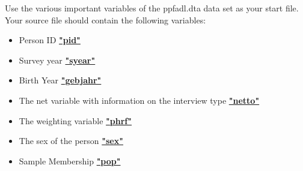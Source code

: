 \documentclass[letterpaper,10pt,openany,onesideH,english]{sphinxmanual}
\begin{document}
Use the various important variables of the ppfadl.dta data set as your start file. Your source file should contain the following variables:
\begin{itemize}
\item {} 
Person ID  \href{https://paneldata.org/soep-long/data/ppfadl/pid}{\textbf{"pid"}}

\item {} 
Survey year  \href{https://paneldata.org/soep-long/data/ppfadl/syear}{\textbf{"syear"}}

\item {} 
Birth Year  \href{https://paneldata.org/soep-long/data/ppfadl/gebjahr}{\textbf{"gebjahr"}}

\item {} 
The net variable with information on the interview type  \href{https://paneldata.org/soep-long/data/ppfadl/netto}{\textbf{"netto"}}

\item {} 
The weighting variable  \href{https://paneldata.org/soep-long/data/ppfadl/phrf}{\textbf{"phrf"}}

\item {} 
The sex of the person  \href{https://paneldata.org/soep-long/data/ppfadl/sex}{\textbf{"sex"}}

\item {} 
Sample Membership  \href{https://paneldata.org/soep-long/data/ppfadl/pop}{\textbf{"pop"}}

\end{itemize}

%
\begin{sphinxVerbatim}[commandchars=\\\{\},numbers=left,firstnumber=1,stepnumber=1]
          
\end{sphinxVerbatim}
\end{document}
